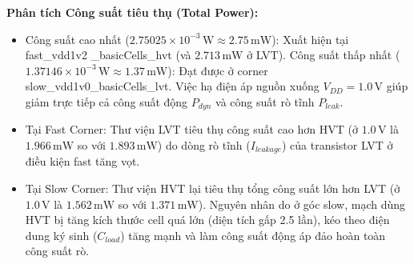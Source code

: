 \documentclass[12pt,a4paper,oneside]{book}
\begin{document}
\textbf{Phân tích Công suất tiêu thụ (Total Power):}
\begin{itemize}
    \item Công suất cao nhất ($2.75025 \times 10^{-3}\,\text{W} \approx 2.75\,\text{mW}$): Xuất hiện tại fast\_vdd1v2 \_basicCells\_hvt (và $2.713\,\text{mW}$ ở LVT). Công suất thấp nhất ($1.37146 \times 10^{-3}\,\text{W} \approx 1.37\,\text{mW}$): Đạt được ở corner slow\_vdd1v0\_basicCells\_lvt. Việc hạ điện áp nguồn xuống $V_{DD} = 1.0\,\text{V}$ giúp giảm trực tiếp cả công suất động $P_{dyn}$ và công suất rò tĩnh $P_{leak}$.
    \item Tại Fast Corner: Thư viện LVT tiêu thụ công suất cao hơn HVT (ở $1.0\,\text{V}$ là $1.966\,\text{mW}$ so với $1.893\,\text{mW}$) do dòng rò tĩnh ($I_{leakage}$) của transistor LVT ở điều kiện fast tăng vọt.
    \item Tại Slow Corner: Thư viện HVT lại tiêu thụ tổng công suất lớn hơn LVT (ở $1.0\,\text{V}$ là $1.562\,\text{mW}$ so với $1.371\,\text{mW}$). Nguyên nhân do ở góc slow, mạch dùng HVT bị tăng kích thước cell quá lớn (diện tích gấp 2.5 lần), kéo theo điện dung ký sinh ($C_{load}$) tăng mạnh và làm công suất động áp đảo hoàn toàn công suất rò.
\end{itemize}
\newpage
\end{document}
